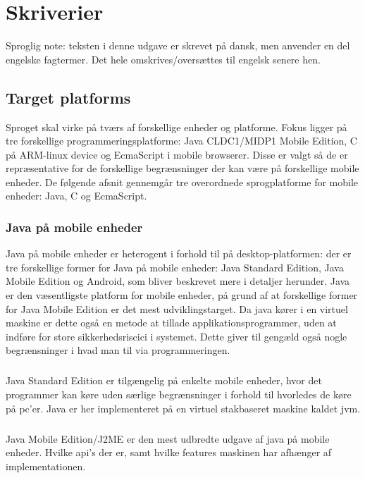 \chapter{Skriverier}
Sproglig note: teksten i denne udgave er skrevet på dansk, men anvender en del engelske fagtermer. 
Det hele omskrives/oversættes til engelsk senere hen.

\section{Target platforms}

Sproget skal virke på tværs af forskellige enheder og platforme. 
Fokus ligger på tre forskellige programmeringsplatforme: 
Java CLDC1/MIDP1 Mobile Edition, C på ARM-linux device og EcmaScript i mobile browserer.
Disse er valgt så de er repræsentative for de forskellige begrænsninger der kan være på forskellige mobile enheder.
De følgende afsnit gennemgår tre overordnede sprogplatforme for mobile enheder: Java, C og EcmaScript. 


\subsection{Java på mobile enheder}
Java på mobile enheder er heterogent i forhold til på desktop-platformen: 
der er tre forskellige former for Java på mobile enheder: Java Standard Edition, Java Mobile Edition og Android, som bliver beskrevet mere i detaljer herunder.
Java er den væsentligste platform for mobile enheder, på grund af at forskellige former for Java Mobile Edition er det mest udviklingstarget.
Da java kører i en virtuel maskine er dette også en metode at tillade applikationsprogrammer, uden at indføre for store sikkerhedsriscici i systemet. 
Dette giver til gengæld også nogle begrænsninger i hvad man til via programmeringen.


\paragraph{}
Java Standard Edition er tilgængelig på enkelte mobile enheder, hvor det programmer kan køre uden særlige begrænsninger i forhold til hvorledes de køre på pc'er.
Java er her implementeret på en virtuel stakbaseret maskine kaldet jvm.

\paragraph{}
Java Mobile Edition/J2ME er den mest udbredte udgave af java på mobile enheder.
Hvilke api's der er, samt hvilke features maskinen har afhænger af implementationen. 

